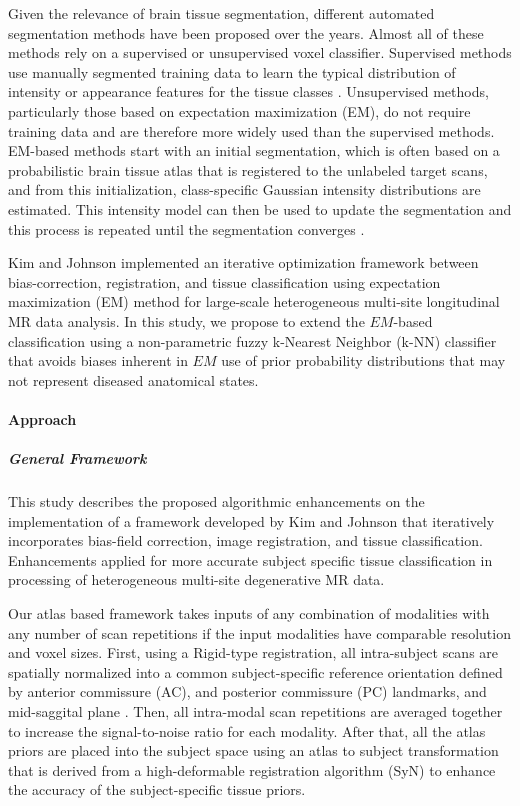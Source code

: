 Given the relevance of brain tissue segmentation, different automated segmentation methods have been proposed over the years. Almost all of these methods rely on a supervised or unsupervised voxel classifier. Supervised methods use manually segmented training data to learn the typical distribution of intensity or appearance features for the tissue classes \cite{Anbeek2005}. Unsupervised methods, particularly those based on expectation maximization (EM), do not require training data and are therefore more widely used than the supervised methods. EM-based methods start with an initial segmentation, which is often based on a probabilistic brain tissue atlas that is registered to the unlabeled target scans, and from this initialization, class-specific Gaussian intensity distributions are estimated. This intensity model can then be used to update the segmentation and this process is repeated until the segmentation converges \cite{vrooman2013auto}.

Kim and Johnson \cite{Kim2013} implemented an iterative optimization framework between bias-correction, registration, and tissue classification using expectation maximization (EM) method for large-scale heterogeneous multi-site longitudinal MR data analysis. In this study, we propose to extend the $EM$-based classification using a non-parametric fuzzy k-Nearest Neighbor (k-NN) classifier that avoids biases inherent in $EM$ use of prior probability distributions that may not represent diseased anatomical states.

\paragraph{Approach} %

\subparagraph{General Framework} %
This study describes the proposed algorithmic enhancements on the implementation of a framework developed by Kim and Johnson \cite{Kim2013} that iteratively incorporates bias-field correction, image registration, and tissue classification. Enhancements applied for more accurate subject specific tissue classification in processing of heterogeneous multi-site degenerative MR data.

Our atlas based framework takes inputs of any combination of modalities with any number of scan repetitions if the input modalities have comparable resolution and voxel sizes. 
First, using a Rigid-type registration, all intra-subject scans are spatially normalized into a common subject-specific reference orientation defined by anterior commissure (AC), and posterior commissure (PC) landmarks, and mid-saggital plane \cite{Ghayoor13}.
Then, all intra-modal scan repetitions are averaged together to increase the signal-to-noise ratio for each modality.
After that, all the atlas priors are placed into the subject space using an atlas to subject transformation that is derived from a high-deformable registration algorithm (SyN) \cite{Avants2008b,avants2009advanced} to enhance the accuracy of the subject-specific tissue priors.


